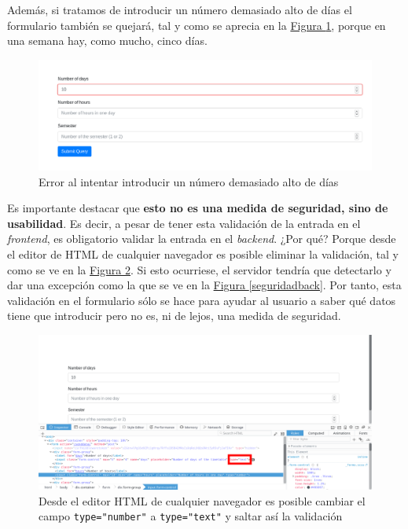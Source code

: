 \begin{enumerate}[$\bullet$]
{  Además, si tratamos de introducir un número demasiado alto de días el formulario también se quejará, tal y como se aprecia en la \hyperref[validationerrormax]{Figura \ref*{validationerrormax}}, porque en una semana hay, como mucho, cinco días. 

  \begin{figure}
    \centering
    \includegraphics[width=\textwidth]{img/validationerrormax}
    \caption{Error al intentar introducir un número demasiado alto de días}
    \label{validationerrormax}
  \end{figure}

  Es importante destacar que \textbf{esto no es una medida de seguridad, sino de usabilidad}. Es decir, a pesar de tener esta validación de la entrada en el \textit{frontend}, es obligatorio validar la entrada en el \textit{backend}. ¿Por qué? Porque desde el editor de HTML de cualquier navegador es posible eliminar la validación, tal y como se ve en la \hyperref[seguridad0]{Figura \ref*{seguridad0}}. Si esto ocurriese, el servidor tendría que detectarlo y dar una excepción como la que se ve en la \hyperref[seguridadback]{Figura \ref*{seguridadback}}. Por tanto, esta validación en el formulario sólo se hace para ayudar al usuario a saber qué datos tiene que introducir pero no es, ni de lejos, una medida de seguridad.

  \begin{figure}
    \centering
    \includegraphics[width=\textwidth]{img/seguridad0}
    \caption{Desde el editor HTML de cualquier navegador es posible cambiar el campo \texttt{type="number"} a \texttt{type="text"} y saltar así la validación}
    \label{seguridad0}
  \end{figure}

}
\end{enumerate}
